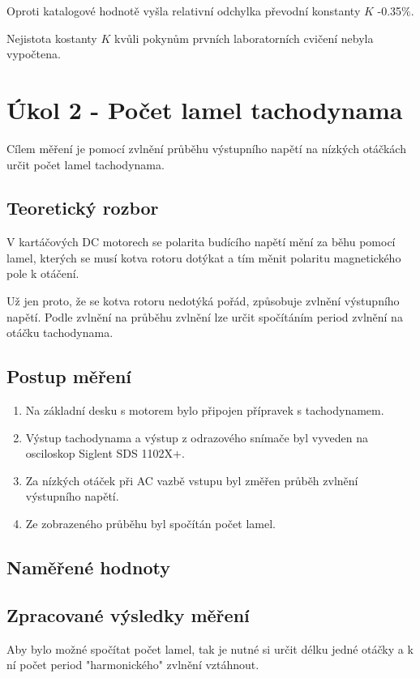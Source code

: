 \documentclass{protokol}
\begin{document}
        Oproti katalogové hodnotě vyšla relativní odchylka převodní konstanty $K$ -0.35$\%$. 

        Nejistota kostanty $K$ kvůli pokynům prvních laboratorních cvičení nebyla vypočtena.

\pagebreak

\section{Úkol 2 - Počet lamel tachodynama}
    Cílem měření je pomocí zvlnění průběhu výstupního napětí na nízkých otáčkách určit počet lamel tachodynama. 
    \subsection{Teoretický rozbor}
        V kartáčových DC motorech se polarita budícího napětí mění za běhu pomocí lamel, kterých se musí kotva rotoru dotýkat a tím měnit polaritu magnetického pole k otáčení.
        
        Už jen proto, že se kotva rotoru nedotýká pořád, způsobuje zvlnění výstupního napětí. Podle zvlnění na průběhu zvlnění lze určit spočítáním period zvlnění na otáčku tachodynama.
    \subsection{Postup měření}
        \begin{enumerate}
             \item Na základní desku s motorem bylo připojen přípravek s tachodynamem.
             \item Výstup tachodynama a výstup z odrazového snímače byl vyveden na osciloskop Siglent SDS 1102X+.
             \item Za nízkých otáček při AC vazbě vstupu byl změřen průběh zvlnění výstupního napětí.
             \item Ze zobrazeného průběhu byl spočítán počet lamel.
        \end{enumerate}
    \subsection{Naměřené hodnoty}

    \pagebreak
    \subsection{Zpracované výsledky měření}
        Aby bylo možné spočítat počet lamel, tak je nutné si určit délku jedné otáčky a k ní počet period "harmonického" zvlnění vztáhnout.
\end{document}
